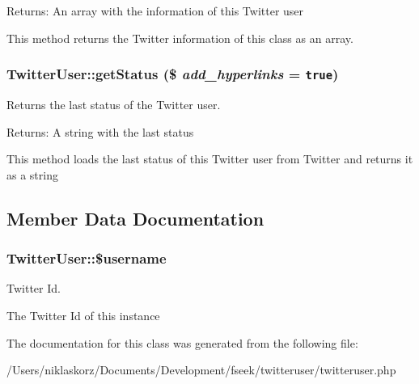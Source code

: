 \begin{Desc}
\item[Returns:]An array with the information of this Twitter user\end{Desc}
This method returns the Twitter information of this class as an array. \hypertarget{class_twitter_user_dee94bac47124658a438a57f9ceb0fae}{
\subsubsection[{getStatus}]{\setlength{\rightskip}{0pt plus 5cm}TwitterUser::getStatus (\$ {\em add\_\-hyperlinks} = {\tt true})}}
\label{class_twitter_user_dee94bac47124658a438a57f9ceb0fae}


Returns the last status of the Twitter user. 

\begin{Desc}
\item[Returns:]A string with the last status\end{Desc}
This method loads the last status of this Twitter user from Twitter and returns it as a string 

\subsection{Member Data Documentation}
\hypertarget{class_twitter_user_344e34fc6dcf01c488347d4146cd8de9}{
\subsubsection[{\$username}]{\setlength{\rightskip}{0pt plus 5cm}TwitterUser::\$username}}
\label{class_twitter_user_344e34fc6dcf01c488347d4146cd8de9}


Twitter Id. 

The Twitter Id of this instance 

The documentation for this class was generated from the following file:\begin{CompactItemize}
\item 
/Users/niklaskorz/Documents/Development/fseek/twitteruser/twitteruser.php\end{CompactItemize}
